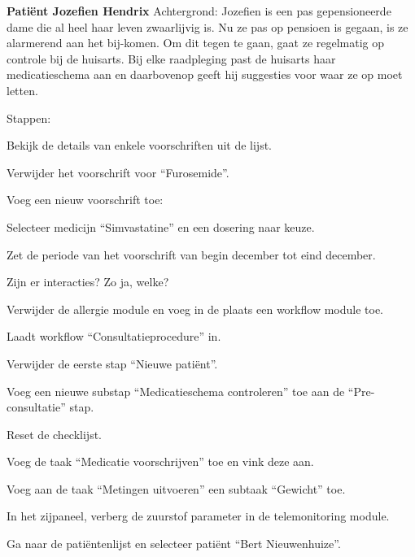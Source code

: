    \noindent\textbf{Pati\"{e}nt Jozefien Hendrix}\newline
    Achtergrond: Jozefien is een pas gepensioneerde dame die al heel haar leven zwaarlijvig is. Nu ze pas op pensioen is gegaan, is ze alarmerend aan het bij-komen. Om dit tegen te gaan, gaat ze regelmatig op controle bij de huisarts. Bij elke raadpleging past de huisarts haar medicatieschema aan en daarbovenop geeft hij suggesties voor waar ze op moet letten.\medskip

    \noindent Stappen:
    \vspace{-6pt}
    \begin{myenumerate}
        \item Bekijk de details van enkele voorschriften uit de lijst.
        \begin{myenumerate}
            \item Verwijder het voorschrift voor ``Furosemide''.
            \item Voeg een nieuw voorschrift toe:
            \begin{myenumerate}
                \item Selecteer medicijn ``Simvastatine'' en een dosering naar keuze.
                \item Zet de periode van het voorschrift van begin december tot eind december.
                \item Zijn er interacties? Zo ja, welke?
            \end{myenumerate}
        \end{myenumerate}
        \item Verwijder de allergie module en voeg in de plaats een workflow module toe.
        \begin{myenumerate}
            \item Laadt workflow ``Consultatieprocedure'' in.
            \item Verwijder de eerste stap ``Nieuwe pati\"{e}nt''.
            \item Voeg een nieuwe substap ``Medicatieschema controleren'' toe aan de ``Pre-consultatie'' stap.
        \end{myenumerate}
        \item Reset de checklijst.
        \begin{myenumerate}
            \item Voeg de taak ``Medicatie voorschrijven'' toe en vink deze aan.
            \item Voeg aan de taak ``Metingen uitvoeren'' een subtaak ``Gewicht'' toe.
        \end{myenumerate}
        \item In het zijpaneel, verberg de zuurstof parameter in de telemonitoring module.
        \vspace{10pt}
        \item Ga naar de pati\"{e}ntenlijst en selecteer pati\"{e}nt ``Bert Nieuwenhuize''.
    \end{myenumerate}

